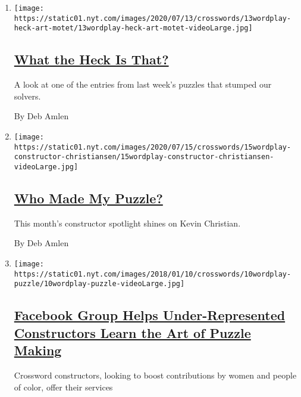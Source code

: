 \begin{enumerate}
\def\labelenumi{\arabic{enumi}.}
\item
  \texttt{[image: https://static01.nyt.com/images/2020/07/13/crosswords/13wordplay-heck-art-motet/13wordplay-heck-art-motet-videoLarge.jpg]}

  \hypertarget{what-the-heck-is-that}{%
  \subsection{\texorpdfstring{\href{/2020/07/13/crosswords/heck-motet-crosswords-puzzles.html}{What
  the Heck Is
  That?}}{What the Heck Is That?}}\label{what-the-heck-is-that}}

  A look at one of the entries from last week's puzzles that stumped our
  solvers.

  By Deb Amlen
\item
  \texttt{[image: https://static01.nyt.com/images/2020/07/15/crosswords/15wordplay-constructor-christiansen/15wordplay-constructor-christiansen-videoLarge.jpg]}

  \hypertarget{who-made-my-puzzle}{%
  \subsection{\texorpdfstring{\href{/2020/07/15/crosswords/christian-constructor-crosswords-puzzles.html}{Who
  Made My Puzzle?}}{Who Made My Puzzle?}}\label{who-made-my-puzzle}}

  This month's constructor spotlight shines on Kevin Christian.

  By Deb Amlen
\item
  \texttt{[image: https://static01.nyt.com/images/2018/01/10/crosswords/10wordplay-puzzle/10wordplay-puzzle-videoLarge.jpg]}

  \hypertarget{facebook-group-helps-under-represented-constructors-learn-the-art-of-puzzle-making}{%
  \subsection{\texorpdfstring{\href{/2018/01/10/crosswords/facebook-crossword-puzzle-group.html}{Facebook
  Group Helps Under-Represented Constructors Learn the Art of Puzzle
  Making}}{Facebook Group Helps Under-Represented Constructors Learn the Art of Puzzle Making}}\label{facebook-group-helps-under-represented-constructors-learn-the-art-of-puzzle-making}}

  Crossword constructors, looking to boost contributions by women and
  people of color, offer their services


\end{enumerate}

